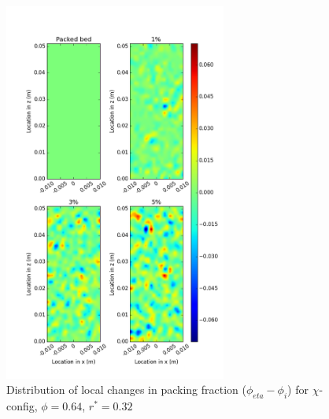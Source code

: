 \begin{figure}[!t]
    \centering
    \includegraphics[width = 0.65\textwidth]{figures/x-62-r23-1-deltas.png}
    \caption{Distribution of local changes in packing fraction ($\phi_{eta} - \phi_i$) for $\chi$-config, $\phi = 0.64$, $r^* = 0.32$}\label{fig:x-624-r23-deltas}
\end{figure}

